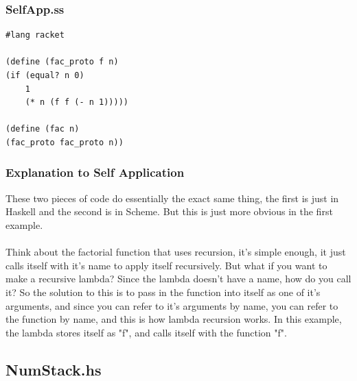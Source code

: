 \documentclass[12pt]{article}
\begin{document}
\subsubsection{SelfApp.ss}

\begin{lstlisting}
#lang racket

(define (fac_proto f n)
(if (equal? n 0)
    1
    (* n (f f (- n 1)))))

(define (fac n)
(fac_proto fac_proto n))
\end{lstlisting}

\subsubsection{Explanation to Self Application}

These two pieces of code do essentially the exact same thing, the first is just in Haskell and the second is in Scheme. But this is just more obvious in the first example.\\
\\
Think about the factorial function that uses recursion, it's simple enough, it just calls itself with it's name to apply itself recursively. But what if you want to make a recursive lambda? Since the lambda doesn't have a name, how do you call it? So the solution to this is to pass in the function into itself as one of it's arguments, and since you can refer to it's arguments by name, you can refer to the function by name, and this is how lambda recursion works. In this example, the lambda stores itself as "f", and calls itself with the function "f".

\subsection{NumStack.hs}
\end{document}
